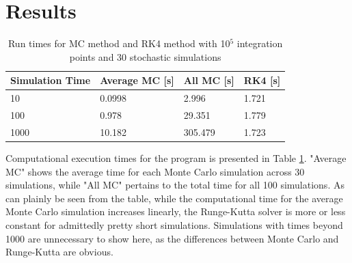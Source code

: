 \section{Results}

\begin{table}[H]
\centering
\caption{Run times for MC method and RK4 method with 10$^5$ integration points and 30 stochastic simulations}
\begin{tabular}{|l|l|l|l|}
\hline
Simulation Time & Average MC [s] & All MC [s]& RK4 [s]\\
\hline
10 & 0.0998 & 2.996 & 1.721 \\
100 & 0.978 & 29.351 & 1.779\\
1000 & 10.182 & 305.479 & 1.723\\
\hline
\end{tabular}
\label{tab:Run_times}
\end{table}

Computational execution times for the program is presented in Table \ref{tab:Run_times}. "Average MC" shows the average time for each Monte Carlo simulation across 30 simulations, while "All MC" pertains to the total time for all 100 simulations. As can plainly be seen from the table, while the computational time for the average Monte Carlo simulation increases linearly, the Runge-Kutta solver is more or less constant for admittedly pretty short simulations. Simulations with times beyond 1000 are unnecessary to show here, as the differences between Monte Carlo and Runge-Kutta are obvious. 

